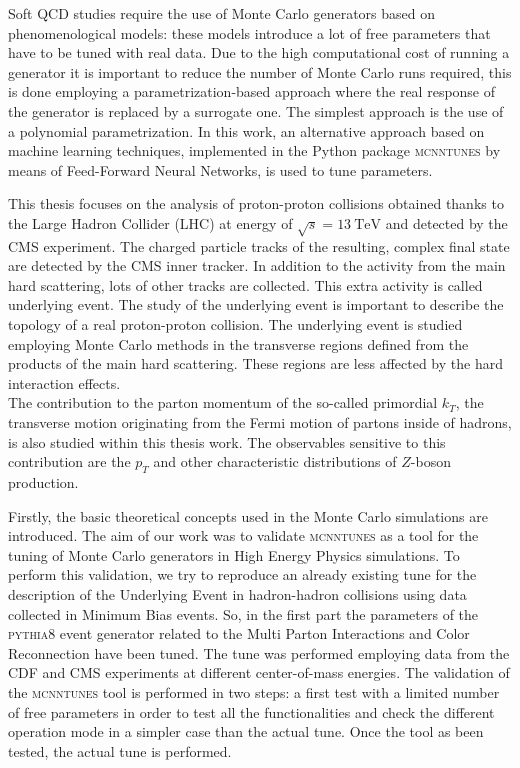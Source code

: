 Soft QCD studies require the use of Monte Carlo generators based on phenomenological models: these models introduce a lot of free parameters that have to be tuned with real data.
Due to the high computational cost of running a generator it is important to reduce the number of Monte Carlo runs required, this is done employing a parametrization-based approach where the real response of the generator is replaced by a surrogate one. The simplest approach is the use of a polynomial parametrization. 
In this work, an alternative approach based on machine learning techniques, implemented in the Python package \textsc{mcnntunes} by means of Feed-Forward Neural Networks, is used to tune parameters. 

\medskip
This thesis focuses on the analysis of proton-proton collisions obtained thanks to the Large Hadron Collider (LHC) at energy of $\sqrt{s}=13\ \mathrm{TeV}$ and detected by the CMS experiment. The charged particle tracks of the resulting, complex final state are detected by the CMS inner tracker. In addition to the activity from the main hard scattering, lots of other tracks are collected. This extra activity is called underlying event. The study of the  underlying event is important to describe the topology of a real proton-proton collision. The underlying event is studied employing Monte Carlo methods in the transverse regions defined from the products of the main hard scattering. These regions are less affected by the hard interaction effects.
\\
The contribution to the parton momentum of the so-called primordial $k_T$, the transverse motion originating from the Fermi motion of partons inside of hadrons, is also studied within this thesis work. The observables sensitive to this contribution are the $p_T$ and other characteristic distributions of $Z$-boson production.
\medskip

Firstly, the basic theoretical concepts used in the Monte Carlo simulations are introduced.
The aim of our work was to validate \textsc{mcnntunes} as a tool for the tuning of Monte Carlo generators in High Energy Physics simulations.
To perform this validation, we try to reproduce an already existing tune for the description of the Underlying Event in hadron-hadron collisions using data collected in Minimum Bias events.
So, in the first part the parameters of the \textsc{pythia}8 event generator related to the Multi Parton Interactions and Color Reconnection  have been tuned. The tune was performed employing data from the CDF and CMS experiments at different center-of-mass energies. The validation of the \textsc{mcnntunes} tool is performed in two steps: a first test with a limited number of free parameters in order to test all the functionalities and check the different operation mode in a simpler case than the actual tune. Once the tool as been tested, the actual tune is performed. 

